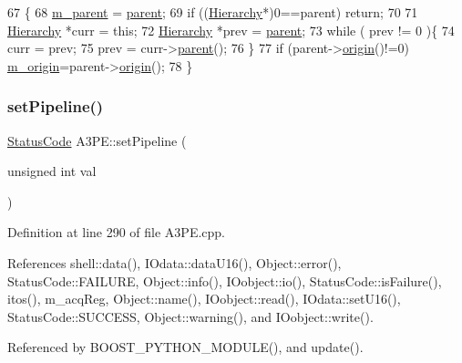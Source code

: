 \begin{DoxyCode}
67                                               \{
68   \hyperlink{classHierarchy_a5814bb280d4e8539ab25ab6cbfb9cc4f}{m\_parent} = \hyperlink{classHierarchy_a1c7bec8257e717f9c1465e06ebf845fc}{parent};
69   \textcolor{keywordflow}{if} ((\hyperlink{classHierarchy}{Hierarchy}*)0==parent) \textcolor{keywordflow}{return};
70 
71   \hyperlink{classHierarchy}{Hierarchy} *curr = \textcolor{keyword}{this};
72   \hyperlink{classHierarchy}{Hierarchy} *prev = \hyperlink{classHierarchy_a1c7bec8257e717f9c1465e06ebf845fc}{parent};
73   \textcolor{keywordflow}{while} ( prev != 0 )\{
74     curr = prev;
75     prev = curr->\hyperlink{classHierarchy_a1c7bec8257e717f9c1465e06ebf845fc}{parent}();
76   \}
77   \textcolor{keywordflow}{if} (parent->\hyperlink{classHierarchy_aee461dc930ce3871636ff87f075b1b83}{origin}()!=0) \hyperlink{classHierarchy_a16c73e557d3a7c156ffb5dc4102d148e}{m\_origin}=parent->\hyperlink{classHierarchy_aee461dc930ce3871636ff87f075b1b83}{origin}();
78 \}
\end{DoxyCode}
\mbox{\label{classA3PE_a5b3840fc8edd14427ac9fb4def3171d3}} 
\subsubsection{\texorpdfstring{set\+Pipeline()}{setPipeline()}}
{\footnotesize\ttfamily \hyperlink{classStatusCode}{Status\+Code} A3\+P\+E\+::set\+Pipeline (\begin{DoxyParamCaption}\item[{unsigned int}]{val }\end{DoxyParamCaption})}



Definition at line 290 of file A3\+P\+E.\+cpp.



References shell\+::data(), I\+Odata\+::data\+U16(), Object\+::error(), Status\+Code\+::\+F\+A\+I\+L\+U\+RE, Object\+::info(), I\+Oobject\+::io(), Status\+Code\+::is\+Failure(), itos(), m\+\_\+acq\+Reg, Object\+::name(), I\+Oobject\+::read(), I\+Odata\+::set\+U16(), Status\+Code\+::\+S\+U\+C\+C\+E\+SS, Object\+::warning(), and I\+Oobject\+::write().



Referenced by B\+O\+O\+S\+T\+\_\+\+P\+Y\+T\+H\+O\+N\+\_\+\+M\+O\+D\+U\+L\+E(), and update().


